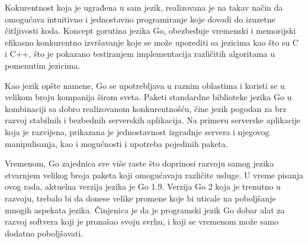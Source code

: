 \documentclass[12pt,oneside]{memoir}
\begin{document}
Kokurentnost koja je ugrađena u sam jezik, realizovana je na takav način da omogućava intuitivno i jednostavno programiranje koje dovodi do izuzetne čitljivosti koda. Koncept gorutina jezika Go, obezbeđuje vremenski i memorijski efikasno konkurentno izvršavanje koje se može uporediti sa jezicima kao što su C i C++, što je pokazano testiranjem implementacija različitih algoritama u pomenutim jezicima.

Kao jezik opšte namene, Go se upotrebljava u raznim oblastima i koristi se u velikom broju kompanija širom sveta. Paketi standardne biblioteke jezika Go u kombinaciji sa dobro realizovanom konkurentnošću, čine jezik pogodan za brz razvoj stabilnih i bezbednih serverskih aplikacija. Na primeru serverske aplikacije koja je razvijena, prikazana je jednostavnost izgradnje servera i njegovog manipulisanja, kao i mogućnosti i upotreba pojedinih paketa. 

Vremenom, Go zajednica sve više raste što doprinosi razvoju samog jezika stvarnjem velikog broja paketa koji omogućavaju različite usluge. U vreme pisanja ovog rada, aktuelna verzija jezika je Go 1.9. Verzija Go 2 koja je trenutno u razvoju, trebalo bi da donese velike promene koje bi uticale na poboljšanje mnogih aspekata jezika. Činjenica je da je programski jezik Go dobar alat za razvoj softvera koji je pronašao svoju svrhu, i koji se vremenom može samo dodatno poboljšavati.


\printbibliography 
\backmatter
\end{document}
